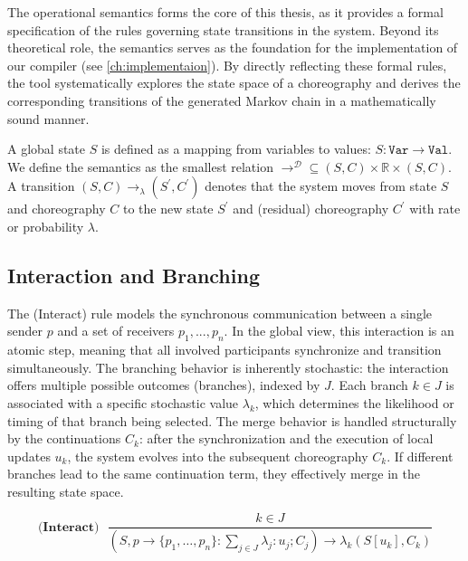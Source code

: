 The operational semantics forms the core of this thesis, as it provides a formal specification of the rules governing state transitions in the system. Beyond its theoretical role, the semantics serves as the foundation for the implementation of our compiler (see \cref{ch:implementaion}). By directly reflecting these formal rules, the tool systematically explores the state space of a choreography and derives the corresponding transitions of the generated Markov chain in a mathematically sound manner. 

A global state $S$ is defined as a mapping from variables to values: $S : \texttt{Var} \rightarrow \texttt{Val}.$
We define the semantics as the smallest relation 
$\longrightarrow^{\mathcal{D}} \subseteq (S,C) \times \mathds{R} \times (S,C)$. A transition $(S,C) \longrightarrow_{\lambda} (S^{'},C^{'}) $ denotes that the system moves from state $S$ and choreography $C$ to the new state $S^{'}$ and (residual) choreography $C^{'}$ with rate or probability $\lambda$. 

\subsection{Interaction and Branching}
\label{paragraph:interaction}
The (Interact) rule models the synchronous communication between a single sender $p$ and a set of receivers ${p_{1},..., p_{n}}$. In the global view, this interaction is an atomic step, meaning that all involved participants synchronize and transition simultaneously. The branching behavior is inherently stochastic: the interaction offers multiple possible outcomes (branches), indexed by $J$. Each branch $k \in J$ is associated with a specific stochastic value $\lambda_{k}$, which determines the likelihood or timing of that branch being selected. The merge behavior is handled structurally by the continuations $C_{k}$: after the synchronization and the execution of local updates $u_{k}$, the system evolves into the subsequent choreography $C_{k}$. If different branches lead to the same continuation term, they effectively merge in the resulting state space. 

\begin{equation}
	\textbf{(Interact)}~~~
	\frac{k \in J}{(S, p \to \{p_1, \dots, p_n\} : \sum_{j \in J} \lambda_j : u_j ; C_j) \longrightarrow{\lambda_k} (S[u_k], C_k)}
\end{equation}

